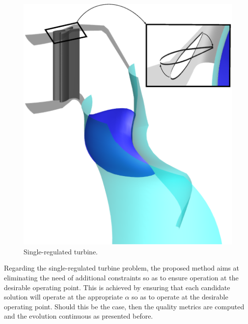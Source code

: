 \begin{figure}[h!]
\centering
\includegraphics[width=.8\textwidth]{SINGLE.eps}
\caption{Single-regulated turbine.}
\label{signle}
\end{figure}


Regarding the single-regulated turbine problem, the proposed method aims at eliminating the need of additional constraints so as to ensure operation at the desirable operating point. This is achieved by ensuring that each candidate solution will operate at the appropriate $\alpha$ so as to operate at the desirable operating point. Should this be the case, then the quality metrics are computed and the evolution continuous as presented before. 

